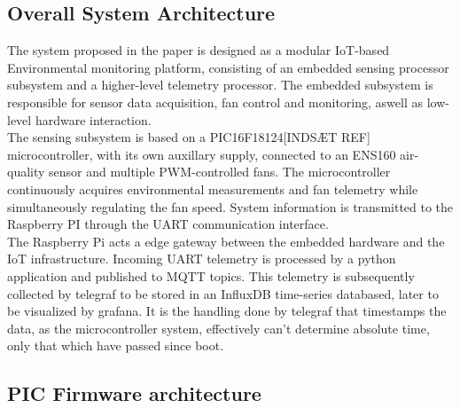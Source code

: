 \subsection{Overall System Architecture}
The system proposed in the paper is designed as a modular IoT-based Environmental
monitoring platform, consisting of an embedded sensing processor subsystem and a higher-level
telemetry processor. The embedded subsystem is responsible for sensor data acquisition, fan control
and monitoring, aswell as low-level hardware interaction.\\

The sensing subsystem is based on a PIC16F18124[INDSÆT REF] microcontroller, with its own
auxillary supply, connected to an ENS160 air-quality sensor and multiple PWM-controlled fans. 
The microcontroller continuously acquires environmental measurements and fan telemetry while
simultaneously regulating the fan speed. System information is transmitted to the Raspberry PI
through the UART communication interface.\\

The Raspberry Pi acts a edge gateway between the embedded hardware and the IoT infrastructure.
Incoming UART telemetry is processed by a python application and published to MQTT topics.
This telemetry is subsequently collected by telegraf to be stored in an InfluxDB time-series 
databased, later to be visualized by grafana. It is the handling done by telegraf that 
timestamps the data, as the microcontroller system, effectively can't determine absolute 
time, only that which have passed since boot. 

\subsection{PIC Firmware architecture}

